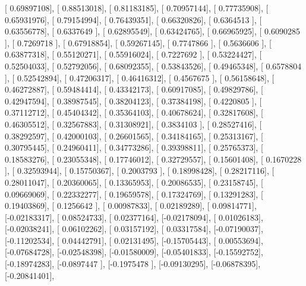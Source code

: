 \documentclass{article}
\begin{document}
       [ 0.69897108],
       [ 0.88513018],
       [ 0.81183185],
       [ 0.70957144],
       [ 0.77735908],
       [ 0.65931976],
       [ 0.79154994],
       [ 0.76439351],
       [ 0.66320826],
       [ 0.6364513 ],
       [ 0.63556778],
       [ 0.6337649 ],
       [ 0.62895549],
       [ 0.63424765],
       [ 0.66965925],
       [ 0.6090285 ],
       [ 0.7269718 ],
       [ 0.67918854],
       [ 0.59267145],
       [ 0.7747866 ],
       [ 0.5636606 ],
       [ 0.63877318],
       [ 0.55120271],
       [ 0.55916024],
       [ 0.7227692 ],
       [ 0.53224427],
       [ 0.52504033],
       [ 0.52792056],
       [ 0.68092355],
       [ 0.53843526],
       [ 0.49465348],
       [ 0.6578804 ],
       [ 0.52542894],
       [ 0.47206317],
       [ 0.46416312],
       [ 0.4567675 ],
       [ 0.56158648],
       [ 0.46272887],
       [ 0.59484414],
       [ 0.43342173],
       [ 0.60917085],
       [ 0.49829786],
       [ 0.42947594],
       [ 0.38987545],
       [ 0.38204123],
       [ 0.37384198],
       [ 0.4220805 ],
       [ 0.37112712],
       [ 0.45404342],
       [ 0.35364103],
       [ 0.40678624],
       [ 0.32817608],
       [ 0.46305512],
       [ 0.32567883],
       [ 0.31308921],
       [ 0.3834103 ],
       [ 0.28527416],
       [ 0.38292597],
       [ 0.42000103],
       [ 0.26601565],
       [ 0.34184165],
       [ 0.25313167],
       [ 0.30795445],
       [ 0.24960411],
       [ 0.34773286],
       [ 0.39398811],
       [ 0.25765373],
       [ 0.18583276],
       [ 0.23055348],
       [ 0.17746012],
       [ 0.32729557],
       [ 0.15601408],
       [ 0.1670228 ],
       [ 0.32593944],
       [ 0.15750367],
       [ 0.2003793 ],
       [ 0.18998428],
       [ 0.28217116],
       [ 0.28011047],
       [ 0.20360065],
       [ 0.13365953],
       [ 0.20086535],
       [ 0.23158745],
       [ 0.09669069],
       [ 0.22332277],
       [ 0.19659578],
       [ 0.17324769],
       [ 0.13291283],
       [ 0.19403869],
       [ 0.1256642 ],
       [ 0.00987833],
       [ 0.02189289],
       [ 0.09814771],
       [-0.02183317],
       [ 0.08524733],
       [ 0.02377164],
       [-0.02178094],
       [ 0.01026183],
       [-0.02038241],
       [ 0.06102262],
       [ 0.03157192],
       [ 0.03317584],
       [-0.07190037],
       [-0.11202534],
       [ 0.04442791],
       [ 0.02131495],
       [-0.15705443],
       [ 0.00553694],
       [-0.07684728],
       [-0.02548398],
       [-0.01580009],
       [-0.05401833],
       [-0.15592752],
       [-0.18974283],
       [-0.0897447 ],
       [-0.1975478 ],
       [-0.09130295],
       [-0.06878395],
       [-0.20841401],
\end{document}

